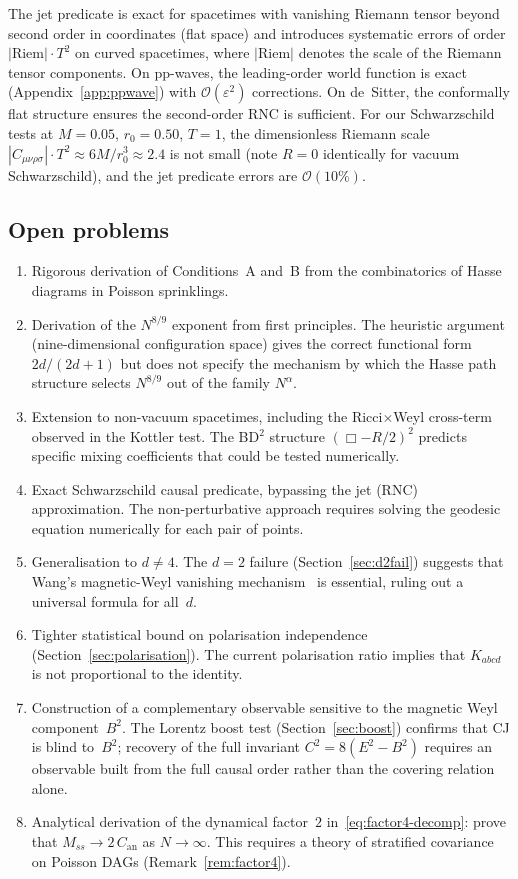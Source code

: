 \documentclass[12pt,a4paper]{article}
\theoremstyle{plain}
\theoremstyle{definition}
\theoremstyle{remark}
\newcommand{\order}{\mathcal{O}}
\begin{document}
The jet predicate is exact for spacetimes with vanishing Riemann
tensor beyond second order in coordinates (flat space) and
introduces systematic errors of order
$|\mathrm{Riem}| \cdot T^2$ on curved spacetimes, where
$|\mathrm{Riem}|$ denotes the scale of the Riemann tensor
components.  On pp-waves, the leading-order world function is
exact (Appendix~\ref{app:ppwave}) with $\order(\varepsilon^2)$
corrections.  On de~Sitter, the conformally flat structure ensures
the second-order RNC is sufficient.
For our Schwarzschild tests at $M = 0.05$, $r_0 = 0.50$, $T = 1$,
the dimensionless Riemann scale
$|C_{\mu\nu\rho\sigma}| \cdot T^2 \approx 6M/r_0^3 \approx 2.4$
is not small (note $R = 0$ identically for vacuum Schwarzschild),
and the jet predicate errors are $\order(10\%)$.

\subsection{Open problems}
\label{sec:open}

\begin{enumerate}[(1)]
\item Rigorous derivation of Conditions~A and~B from the
  combinatorics of Hasse diagrams in Poisson sprinklings.
\item Derivation of the $N^{8/9}$ exponent from first principles.
  The heuristic argument (nine-dimensional configuration space)
  gives the correct functional form $2d/(2d+1)$ but does not
  specify the mechanism by which the Hasse path structure selects
  $N^{8/9}$ out of the family $N^\alpha$.
\item Extension to non-vacuum spacetimes, including the
  Ricci$\times$Weyl cross-term observed in the Kottler test.
  The BD${}^2$ structure $(\Box - R/2)^2$ predicts specific
  mixing coefficients that could be tested numerically.
\item Exact Schwarzschild causal predicate, bypassing the jet
  (RNC) approximation.  The non-perturbative approach requires
  solving the geodesic equation numerically for each pair of
  points.
\item Generalisation to $d \neq 4$.  The $d = 2$ failure
  (Section~\ref{sec:d2fail}) suggests that Wang's magnetic-Weyl
  vanishing mechanism~\cite{Wang:2019} is essential, ruling out
  a universal formula for all~$d$.
\item Tighter statistical bound on polarisation independence
  (Section~\ref{sec:polarisation}).  The current polarisation
  ratio implies that $K_{abcd}$ is not proportional to the identity.
\item Construction of a complementary observable sensitive to the
  magnetic Weyl component~$B^2$.  The Lorentz boost test
  (Section~\ref{sec:boost}) confirms that CJ is blind to~$B^2$;
  recovery of the full invariant $C^2 = 8(E^2 - B^2)$ requires
  an observable built from the full causal order rather than the
  covering relation alone.
\item Analytical derivation of the dynamical factor~$2$
  in~\eqref{eq:factor4-decomp}: prove that $M_{ss} \to
  2\,C_{\mathrm{an}}$ as $N \to \infty$.  This requires a
  theory of stratified covariance on Poisson DAGs
  (Remark~\ref{rem:factor4}).
\end{enumerate}
\end{document}
